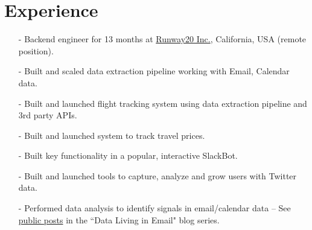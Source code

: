 \documentclass[a4paper, 10pt]{article}
\begin{document}
\vspace*{2mm}
\section{Experience}
\vspace*{2mm}
\vspace*{-1mm}
\begin{itemize}
    \item[-] Backend engineer for 13 months at \href{http://www.weldai.com/}{Runway20 Inc.}, California, USA (remote position).\vspace*{-2mm}
    \item[-] Built and scaled data extraction pipeline working with Email, Calendar data.\vspace*{-2mm}
    \item[-] Built and launched flight tracking system using data extraction pipeline and 3rd party APIs.\vspace*{-2mm}
    \item[-] Built and launched system to track travel prices.\vspace*{-2mm}
    \item[-] Built key functionality in a popular, interactive SlackBot.\vspace*{-2mm}
    \item[-] Built and launched tools to capture, analyze and grow users with Twitter data.\vspace*{-2mm}
    \item[-] Performed data analysis to identify signals in email/calendar data -- See \href{http://www.weldai.com/blog/}{public posts} in the ``Data Living in Email" blog series.
\end{itemize}
\end{document}
